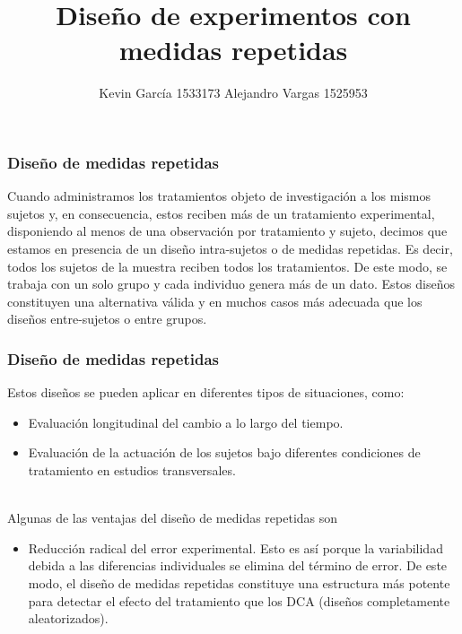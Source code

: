 \documentclass[12pt]{beamer}
\author[Kevin García - Alejandro Vargas]{Kevin García 1533173 \newline Alejandro Vargas 1525953}
\title[Diseños con medidas repetidas]{Diseño de experimentos con medidas repetidas}
\begin{document}
\justifying
\begin{frame}[plain]
\maketitle
\end{frame}

\begin{frame}
\frametitle{Diseño de medidas repetidas}
Cuando administramos los tratamientos objeto de investigación a los mismos sujetos y, en
consecuencia, estos reciben más de un tratamiento experimental, disponiendo al menos de una
observación por tratamiento y sujeto, decimos que estamos en presencia de un diseño intra-sujetos
o de medidas repetidas. Es decir, todos los sujetos de la muestra reciben todos los tratamientos.
De este modo, se trabaja con un solo grupo y cada individuo genera más de un dato. Estos diseños
constituyen una alternativa válida y en muchos casos más adecuada que los diseños entre-sujetos
o entre grupos.
\end{frame}

\begin{frame}
\frametitle{Diseño de medidas repetidas}
Estos diseños se pueden aplicar en diferentes tipos de situaciones, como:
\begin{itemize}
\justifying
\item Evaluación longitudinal del cambio a lo largo del tiempo.
\item Evaluación de la actuación de los sujetos bajo diferentes condiciones de tratamiento en
estudios transversales.
\end{itemize}
~\\Algunas de las ventajas del diseño de medidas repetidas son
\begin{itemize}
\justifying
\item Reducción radical del error experimental. Esto es así porque la variabilidad debida a las
diferencias individuales se elimina del término de error. De este modo, el diseño de medidas
repetidas constituye una estructura más potente para detectar el efecto del tratamiento que los
DCA (diseños completamente aleatorizados).
\end{itemize}
\end{frame}
\end{document}
